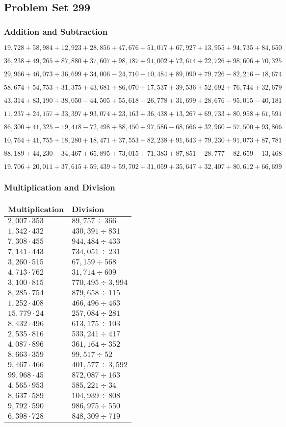\hypertarget{problem-set-299}{%
\subsection{Problem Set 299}\label{problem-set-299}}

\hypertarget{addition-and-subtraction}{%
\subsubsection{Addition and
Subtraction}\label{addition-and-subtraction}}

\(19,728+58,984+12,923+28,856+47,676+51,017+67,927+13,955+94,735+84,650\)

\(36,238+49,265+87,880+37,607+98,187+91,002+72,614+22,726+98,606+70,325\)

\(29,966+46,073+36,699+34,006-24,710-10,484+89,090+79,726-82,216-18,674\)

\(58,674+54,753+31,375+43,681+86,070+17,537+39,536+52,692+76,744+32,679\)

\(43,314+83,190+38,050-44,505+55,618-26,778+31,699+28,676-95,015-40,181\)

\(11,237+24,157+33,397+93,074+23,163+36,438+13,267+69,733+80,958+61,591\)

\(86,300+41,325-19,418-72,498+88,450+97,586-68,666+32,960-57,500+93,866\)

\(10,764+41,755+18,280+18,471+37,553+82,238+91,643+79,230+91,073+87,781\)

\(88,189+44,230-34,467+65,895+73,015+71,383+87,851-28,777-82,659-13,468\)

\(19,706+20,011+37,615+59,439+59,702+31,059+35,647+32,407+80,612+66,699\)

\hypertarget{multiplication-and-division}{%
\subsubsection{Multiplication and
Division}\label{multiplication-and-division}}

\begin{longtable}[]{@{}ll@{}}
\toprule
Multiplication & Division\tabularnewline
\midrule
\endhead
\(2,007\cdot353\) & \(89,757÷366\)\tabularnewline
\(1,342\cdot432\) & \(430,391÷831\)\tabularnewline
\(7,308\cdot455\) & \(944,484÷433\)\tabularnewline
\(7,141\cdot443\) & \(734,051÷231\)\tabularnewline
\(3,260\cdot515\) & \(67,159÷568\)\tabularnewline
\(4,713\cdot762\) & \(31,714÷609\)\tabularnewline
\(3,100\cdot815\) & \(770,495÷3,994\)\tabularnewline
\(8,285\cdot754\) & \(879,658÷115\)\tabularnewline
\(1,252\cdot408\) & \(466,496÷463\)\tabularnewline
\(15,779\cdot24\) & \(257,084÷281\)\tabularnewline
\(8,432\cdot496\) & \(613,175÷103\)\tabularnewline
\(2,535\cdot816\) & \(533,241÷417\)\tabularnewline
\(4,087\cdot896\) & \(361,164÷352\)\tabularnewline
\(8,663\cdot359\) & \(99,517÷52\)\tabularnewline
\(9,467\cdot466\) & \(401,577÷3,592\)\tabularnewline
\(99,968\cdot45\) & \(872,087÷163\)\tabularnewline
\(4,565\cdot953\) & \(585,221÷34\)\tabularnewline
\(8,637\cdot589\) & \(104,939÷808\)\tabularnewline
\(9,792\cdot590\) & \(986,975÷550\)\tabularnewline
\(6,398\cdot728\) & \(848,309÷719\)\tabularnewline
\bottomrule
\end{longtable}

